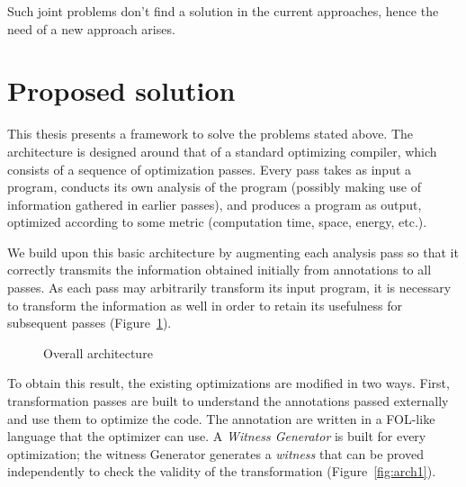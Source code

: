 Such joint problems don't find a solution in the current approaches, hence the need of a new approach arises.

\section{Proposed solution}
\label{sec:proposed_solution}

This thesis presents a framework to solve the problems stated above. The architecture is designed around that of a standard optimizing compiler, which consists of a sequence of optimization passes. Every pass takes as input a program, conducts its own analysis of the program (possibly making use of information gathered in earlier passes), and produces a program as output, optimized according to some metric (computation time, space, energy, etc.).

We build upon this basic architecture by augmenting each analysis pass so that it correctly transmits the information obtained initially from annotations to all passes. As each pass may arbitrarily transform its input program, it is necessary to transform the information as well in order to retain its usefulness for subsequent passes (Figure~\ref{fig:arch2}).

\begin{figure}[t]
  \begin{mdframed}
  \centering
  \end{mdframed}
  \caption{Overall architecture}
  \label{fig:arch2}
\end{figure}

To obtain this result, the existing optimizations are modified in two ways. First, transformation passes are built to understand the annotations passed externally and use them to optimize the code. The annotation are written in a FOL-like language that the optimizer can use. A \emph{Witness Generator} is built for every optimization; the witness Generator generates a \emph{witness} that can be proved independently to check the validity of the transformation (Figure~\ref{fig:arch1}).


